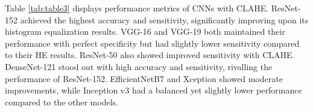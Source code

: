 \documentclass{article}
\begin{document}
\begin{table}
    \caption{Performance Metrics of Convolutional Neural Network Models with CLAHE}
    \label{tab:table3}
\end{table}

Table \ref{tab:table3} displays performance metrics of CNNs with CLAHE. ResNet-152 achieved the highest accuracy and sensitivity, significantly improving upon its histogram equalization results. VGG-16 and VGG-19 both maintained their performance with perfect specificity but had slightly lower sensitivity compared to their HE results. ResNet-50 also showed improved sensitivity with CLAHE. DenseNet-121 stood out with high accuracy and sensitivity, rivalling the performance of ResNet-152. EfficientNetB7 and Xception showed moderate improvements, while Inception v3 had a balanced yet slightly lower performance compared to the other models.
\end{document}
